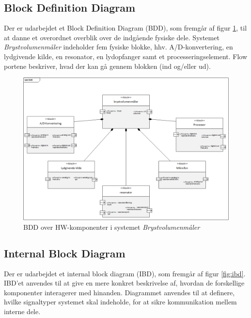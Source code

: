 \subsection{Block Definition Diagram}
Der er udarbejdet et Block Definition Diagram (BDD), som fremgår af figur \ref{fig:bdd}, til at danne et overordnet overblik over de indgående fysiske dele. Systemet \textit{Brystvolumenmåler} indeholder fem fysiske blokke, hhv. A/D-konvertering, en lydgivende kilde, en resonator, en lydopfanger samt et processeringselement. Flow portene beskriver, hvad der kan gå gennem blokken (ind og/eller ud).  
 
\begin{figure}[htb]
\centering
\includegraphics[width=5.5in]{bdd.png}
\caption{BDD over HW-komponenter i systemet \textit{Brystvolumenmåler}}
\label{fig:bdd}	
\end{figure}

\subsection{Internal Block Diagram}
Der er udarbejdet et internal block diagram (IBD), som fremgår af figur \ref{fig:ibd}. IBD'et anvendes til at give en mere konkret beskrivelse af, hvordan de forskellige komponenter interagerer med hinanden. Diagrammet anvendes til at definere, hvilke signaltyper systemet skal indeholde, for at sikre kommunikation mellem interne dele. 

